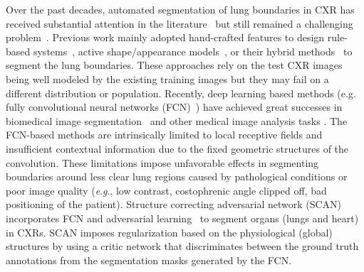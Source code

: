 \documentclass{midl} \usepackage{multirow}
\newcommand{\eg}{\textit{e}.\textit{g}., }
\begin{document}
Over the past decades, automated segmentation of lung boundaries in CXR has received substantial attention in the literature~\cite{Candemir_TMI14, dai17scan} but still remained a challenging problem~\cite{ el2016biomedical}. Previous work mainly adopted hand-crafted features to design rule-based systems~\cite{LI2001629}, active shape/appearance models~\cite{XU2012452}, or their hybrid methods~\cite{Candemir_TMI14} to segment the lung boundaries. These approaches rely on the test CXR images being well modeled by the existing training images but they may fail on a different distribution or population. Recently, deep learning based methods (e.g. fully convolutional neural networks (FCN)~\cite{FCN}) have achieved great successes in biomedical image segmentation~\cite{DRINet,tang2019ct,cai2018accurate,tang2018ct} and other medical image analysis tasks \cite{tang2019deep,tang2019abnormal,tang2019uldor,tang2018semi,jin2018ct,yan2018deep,yan2019fine}. 
The FCN-based methods are intrinsically limited to local receptive fields and insufficient contextual information due to the fixed geometric structures of the convolution. These limitations impose unfavorable effects in segmenting boundaries around less clear lung regions caused by pathological conditions or poor image quality (\eg low contrast, costophrenic angle clipped off, bad positioning of the patient). Structure correcting adversarial network (SCAN)~\cite{dai17scan} incorporates FCN and adversarial learning~\cite{GAN} to segment organs (lungs and heart) in CXRs. SCAN imposes regularization based on the physiological (global) structures by using a critic network that discriminates between the ground truth annotations from the segmentation masks generated by the FCN.
\end{document}

